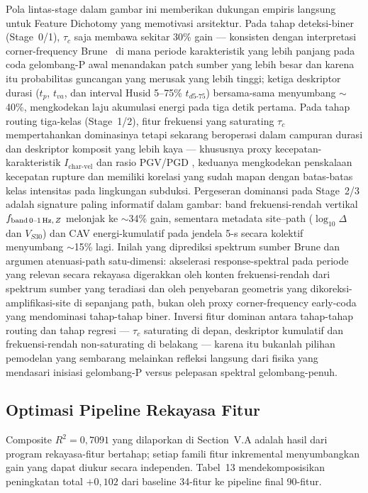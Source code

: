 \documentclass[10pt]{article}
\renewcommand{\cite}[1]{\citep{#1}}
\begin{document}
Pola lintas-stage dalam gambar ini memberikan dukungan empiris langsung untuk Feature Dichotomy yang memotivasi arsitektur. Pada tahap deteksi-biner (Stage~0/1), $\tau_c$ saja membawa sekitar 30\% gain --- konsisten dengan interpretasi corner-frequency Brune~\cite{ref54} di mana periode karakteristik yang lebih panjang pada coda gelombang-P awal menandakan patch sumber yang lebih besar dan karena itu probabilitas guncangan yang merusak yang lebih tinggi; ketiga deskriptor durasi ($t_p$, $t_{va}$, dan interval Husid 5--75\% $t_{d5\text{-}75}$) bersama-sama menyumbang $\sim$40\%, mengkodekan laju akumulasi energi pada tiga detik pertama. Pada tahap routing tiga-kelas (Stage~1/2), fitur frekuensi yang saturating $\tau_c$ mempertahankan dominasinya tetapi sekarang beroperasi dalam campuran durasi dan deskriptor komposit yang lebih kaya --- khususnya proxy kecepatan-karakteristik $I_{\text{char-vel}}$ dan rasio PGV/PGD \cite{ref29}, keduanya mengkodekan penskalaan kecepatan rupture dan memiliki korelasi yang sudah mapan dengan batas-batas kelas intensitas pada lingkungan subduksi. Pergeseran dominansi pada Stage~2/3 adalah signature paling informatif dalam gambar: band frekuensi-rendah vertikal $f_{\text{band\,0--1\,Hz},\,Z}$ melonjak ke $\sim$34\% gain, sementara metadata site--path ($\log_{10}\!\Delta$ dan $V_{S30}$) dan CAV energi-kumulatif pada jendela 5-s secara kolektif menyumbang $\sim$15\% lagi. Inilah yang diprediksi spektrum sumber Brune dan argumen atenuasi-path satu-dimensi: akselerasi response-spektral pada periode yang relevan secara rekayasa digerakkan oleh konten frekuensi-rendah dari spektrum sumber yang teradiasi dan oleh penyebaran geometris yang dikoreksi-amplifikasi-site di sepanjang path, bukan oleh proxy corner-frequency early-coda yang mendominasi tahap-tahap biner. Inversi fitur dominan antara tahap-tahap routing dan tahap regresi --- $\tau_c$ saturating di depan, deskriptor kumulatif dan frekuensi-rendah non-saturating di belakang --- karena itu bukanlah pilihan pemodelan yang sembarang melainkan refleksi langsung dari fisika yang mendasari inisiasi gelombang-P versus pelepasan spektral gelombang-penuh.

\subsection{Optimasi Pipeline Rekayasa Fitur}

Composite \(R^2 = 0,7091\) yang dilaporkan di Section~V.A adalah hasil dari program rekayasa-fitur bertahap; setiap famili fitur inkremental menyumbangkan gain yang dapat diukur secara independen. Tabel~13 mendekomposisikan peningkatan total \(+0,102\) dari baseline 34-fitur ke pipeline final 90-fitur.
\end{document}
